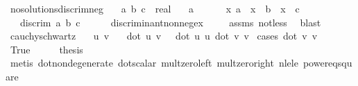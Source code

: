 \begin{isabellebody}
\isanewline
{}\isamarkupfalse%
\ no{\isacharunderscore}{\kern0pt}solutions{\isacharunderscore}{\kern0pt}discrim{\isacharunderscore}{\kern0pt}neg{\isacharcolon}{\kern0pt}\isanewline
\ \ \ a\ b\ c\ {\isacharcolon}{\kern0pt}{\isacharcolon}{\kern0pt}\ real\isanewline
\ \ \ {\isachardoublequoteopen}a\ {\isasymnoteq}\ {}{\isachardoublequoteclose}\isanewline
\ \ \ {\isachardoublequoteopen}{\isasymforall}\ x{\isachardot}{\kern0pt}\ a\ {\isacharasterisk}{\kern0pt}\ x\ {\isacharplus}{\kern0pt}\ b\ {\isacharasterisk}{\kern0pt}\ x\ {\isacharplus}{\kern0pt}\ c\ {\isasymnoteq}\ {}{\isachardoublequoteclose}\isanewline
\ \ \ {\isachardoublequoteopen}discrim\ a\ b\ c\ {\isacharless}{\kern0pt}\ {}{\isachardoublequoteclose}\isanewline
%
\isadelimproof
\ \ %
\endisadelimproof
%
\isatagproof
{}\isamarkupfalse%
\ discriminant{\isacharunderscore}{\kern0pt}nonneg{\isacharunderscore}{\kern0pt}ex\ \isanewline
\ \ \isamarkupfalse%
\ assms{\isacharparenleft}{\kern0pt}{}{\isacharcomma}{\kern0pt}{}{\isacharparenright}{\kern0pt}\ not{\isacharunderscore}{\kern0pt}less\ \isamarkupfalse%
\ blast%
\endisatagproof
{\isafoldproof}%
%
\isadelimproof
\isanewline
%
\endisadelimproof
\isanewline
{}\isamarkupfalse%
\ cauchy{\isacharunderscore}{\kern0pt}schwartz{\isacharcolon}{\kern0pt}\isanewline
\ \ \ u\ v\isanewline
\ \ \ {\isachardoublequoteopen}{\isacharparenleft}{\kern0pt}dot\ u\ v{\isacharparenright}{\kern0pt}{\isacharcircum}{\kern0pt}{}\ {\isasymle}\ {\isacharparenleft}{\kern0pt}\ dot\ u\ u{\isacharparenright}{\kern0pt}{\isacharasterisk}{\kern0pt}\ {\isacharparenleft}{\kern0pt}dot\ v\ v{\isacharparenright}{\kern0pt}{\isachardoublequoteclose}\isanewline
%
\isadelimproof
%
\endisadelimproof
%
\isatagproof
{}\isamarkupfalse%
\ {\isacharparenleft}{\kern0pt}cases\ {\isachardoublequoteopen}{\isacharparenleft}{\kern0pt}dot\ v\ v{\isacharparenright}{\kern0pt}\ \ {\isacharequal}{\kern0pt}\ {}{\isachardoublequoteclose}{\isacharparenright}{\kern0pt}\isanewline
\ \ \isamarkupfalse%
\ True\isanewline
\ \ \isamarkupfalse%
\ \isamarkupfalse%
\ {\isacharquery}{\kern0pt}thesis\isanewline
\ \ \isamarkupfalse%
\ {\isacharparenleft}{\kern0pt}metis\ dot{\isacharunderscore}{\kern0pt}non{\isacharunderscore}{\kern0pt}degenerate\ dot{\isacharunderscore}{\kern0pt}scalar\ mult{\isacharunderscore}{\kern0pt}zero{\isacharunderscore}{\kern0pt}left\ mult{\isacharunderscore}{\kern0pt}zero{\isacharunderscore}{\kern0pt}right\ nle{\isacharunderscore}{\kern0pt}le\ power{}{\isacharunderscore}{\kern0pt}eq{\isacharunderscore}{\kern0pt}square{\isacharparenright}{\kern0pt}\isanewline

\end{isabellebody}
